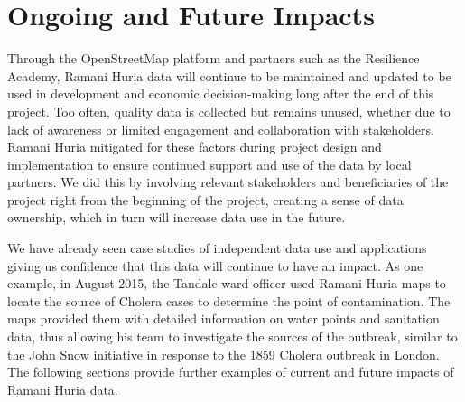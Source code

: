 \documentclass[a4paper,12pt,twoside]{article}
\begin{document}
\section{Ongoing and Future Impacts}
\begin{multicols}{2}
Through the OpenStreetMap platform and partners such as the Resilience Academy, Ramani Huria data will continue to be maintained and updated to be used in development and economic decision-making long after the end of this project. Too often, quality data is collected but remains unused, whether due to lack of awareness or limited engagement and collaboration with stakeholders. Ramani Huria mitigated for these factors during project design and implementation to ensure continued support and use of the data by local partners. We did this by involving relevant stakeholders and beneficiaries of the project right from the beginning of the project, creating a sense of data ownership, which in turn will increase data use in the future.

We have already seen case studies of independent data use and applications giving us confidence that this data will continue to have an impact. As one example, in August 2015, the Tandale ward officer used Ramani Huria maps to locate the source of Cholera cases to determine the point of contamination. The maps provided them with detailed information on water points and sanitation data, thus allowing his team to investigate the sources of the outbreak, similar to the John Snow initiative in response to the 1859 Cholera outbreak in London. The following sections provide further examples of current and future impacts of Ramani Huria data. 
\end{multicols}
\end{document}
